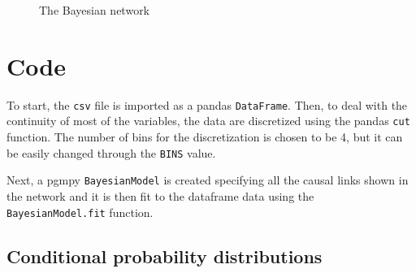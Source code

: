 \documentclass[a4paper, 12pt]{article}
\begin{document}
\begin{figure}
    \centering
    \caption{The Bayesian network}
    \label{fig:network}
\end{figure}


\section{Code}

To start, the \verb|csv| file is imported as a pandas \verb|DataFrame|. Then, to deal with the continuity of most of the variables, the data are discretized using the pandas \verb|cut| function. The number of bins for the discretization is chosen to be 4, but it can be easily changed through the \verb|BINS| value.

Next, a pgmpy \verb|BayesianModel| is created specifying all the causal links shown in the network and it is then fit to the dataframe data using the \verb|BayesianModel.fit| function.


\subsection{Conditional probability distributions}
\end{document}

